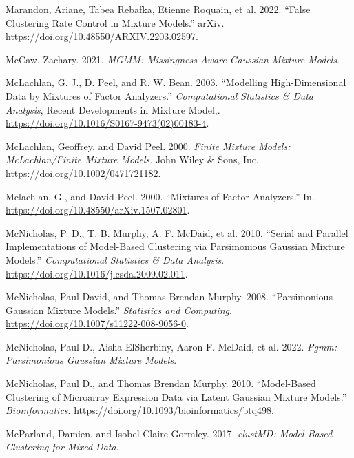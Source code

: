 \begin{CSLReferences}{1}{0}
\leavevmode{}%
Marandon, Ariane, Tabea Rebafka, Etienne Roquain, et al. 2022. {``False Clustering Rate Control in Mixture Models.''} arXiv. \url{https://doi.org/10.48550/ARXIV.2203.02597}.

\leavevmode{}%
McCaw, Zachary. 2021. \emph{MGMM: Missingness Aware Gaussian Mixture Models}.

\leavevmode{}%
McLachlan, G. J., D. Peel, and R. W. Bean. 2003. {``Modelling High-Dimensional Data by Mixtures of Factor Analyzers.''} \emph{Computational Statistics \& Data Analysis}, Recent {Developments} in {Mixture} {Model},. \url{https://doi.org/10.1016/S0167-9473(02)00183-4}.

\leavevmode{}%
McLachlan, Geoffrey, and David Peel. 2000. \emph{Finite {Mixture Models}: {McLachlan}/{Finite Mixture Models}}. John Wiley \& Sons, Inc. \url{https://doi.org/10.1002/0471721182}.

\leavevmode{}%
Mclachlan, G., and David Peel. 2000. {``Mixtures of {Factor} {Analyzers}.''} In. \url{https://doi.org/10.48550/arXiv.1507.02801}.

\leavevmode{}%
McNicholas, P. D., T. B. Murphy, A. F. McDaid, et al. 2010. {``Serial and Parallel Implementations of Model-Based Clustering via Parsimonious Gaussian Mixture Models.''} \emph{Computational Statistics \& Data Analysis}. \url{https://doi.org/10.1016/j.csda.2009.02.011}.

\leavevmode{}%
McNicholas, Paul David, and Thomas Brendan Murphy. 2008. {``Parsimonious Gaussian Mixture Models.''} \emph{Statistics and Computing}. \url{https://doi.org/10.1007/s11222-008-9056-0}.

\leavevmode{}%
McNicholas, Paul D., Aisha ElSherbiny, Aaron F. McDaid, et al. 2022. \emph{Pgmm: Parsimonious Gaussian Mixture Models}.

\leavevmode{}%
McNicholas, Paul D., and Thomas Brendan Murphy. 2010. {``Model-Based Clustering of Microarray Expression Data via Latent Gaussian Mixture Models.''} \emph{Bioinformatics}. \url{https://doi.org/10.1093/bioinformatics/btq498}.

\leavevmode{}%
McParland, Damien, and Isobel Claire Gormley. 2017. \emph{clustMD: Model Based Clustering for Mixed Data}.


\end{CSLReferences}
